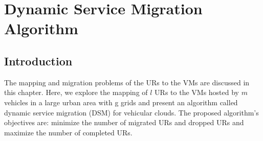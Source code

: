 \chapter{Dynamic Service Migration Algorithm}
\section{Introduction}
The mapping and migration problems of the URs to the VMs are discussed in this chapter. Here, we explore the mapping of $l$ URs to the VMs hosted by $m$ vehicles in a large urban area with g grids and present an algorithm called dynamic service migration (DSM) for vehicular clouds. The proposed algorithm's objectives are: minimize the number of migrated URs and dropped URs and maximize the number of completed URs.
